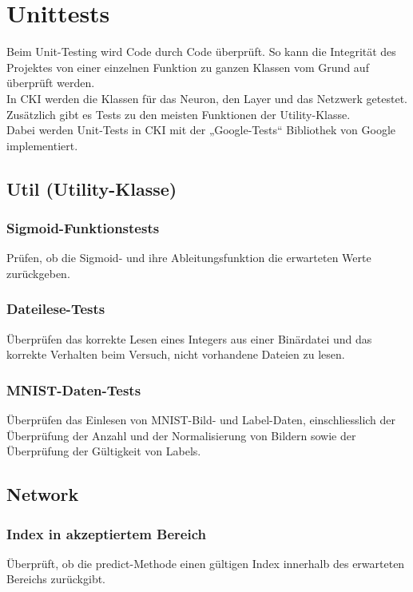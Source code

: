 \section{Unittests}
\label{sec:DesignUnitTesting}
Beim Unit-Testing wird Code durch Code überprüft. So kann die Integrität des Projektes von einer einzelnen Funktion zu ganzen Klassen vom Grund auf überprüft werden.
\\
In CKI werden die Klassen für das Neuron, den Layer und das Netzwerk getestet. Zusätzlich gibt es Tests zu den meisten Funktionen der Utility-Klasse.
\\
Dabei werden Unit-Tests in CKI mit der „Google-Tests“ Bibliothek von Google implementiert.

\subsection{Util (Utility-Klasse)}
\label{sec:DesignUtilUtilityKlasse}
\subsubsection{Sigmoid-Funktionstests}
\label{sec:DesignSigmoidFunktionstests}
Prüfen, ob die Sigmoid- und ihre Ableitungsfunktion die erwarteten Werte zurückgeben.
\subsubsection{Dateilese-Tests}
\label{sec:DesignDateileseTests}
Überprüfen das korrekte Lesen eines Integers aus einer Binärdatei und das korrekte Verhalten beim Versuch, nicht vorhandene Dateien zu lesen.
\subsubsection{MNIST-Daten-Tests}
\label{sec:DesignMNISTDatenTests}
Überprüfen das Einlesen von MNIST-Bild- und Label-Daten, einschliesslich der Überprüfung der Anzahl und der Normalisierung von Bildern sowie der Überprüfung der Gültigkeit von Labels.

\subsection{Network}
\label{sec:DesignNetwork}
\subsubsection{Index in akzeptiertem Bereich}
\label{sec:DesignIndexInAkzeptiertemBereich}
Überprüft, ob die predict-Methode einen gültigen Index innerhalb des erwarteten Bereichs zurückgibt.
